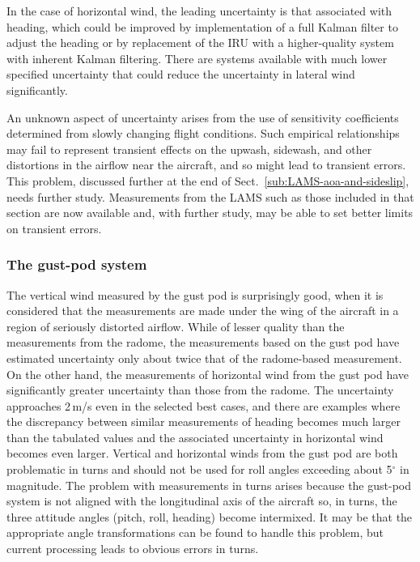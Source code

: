 \documentclass[12pt,twoside,english]{article}\usepackage[]{graphicx}\usepackage[]{color}
\let\OrgIndex\index
\renewcommand*{\index}[1]{\OrgIndex{#1}}
\begin{document}
{{In the case of horizontal wind, the leading uncertainty is that associated with heading, which could be improved by implementation of a full Kalman filter to adjust the heading or by replacement of the IRU with a higher-quality system with inherent Kalman filtering. There are systems available with much lower specified uncertainty that could reduce the uncertainty in lateral wind significantly. 

An unknown aspect of uncertainty arises from the use of sensitivity coefficients determined from slowly changing flight conditions. Such empirical relationships may fail to represent transient effects on the upwash, sidewash, and other distortions in the airflow near the aircraft, and so might lead to transient errors. This problem, discussed further at the end of Sect.\ \ref{sub:LAMS-aoa-and-sideslip}, needs further study. Measurements from the LAMS such as those included in that section are now available and, with further study, may be able to set better limits on transient errors. 


\subsubsection{The gust-pod system}

The vertical wind measured by the gust pod is surprisingly good, when it is considered that the measurements are made under the wing of the aircraft in a region of seriously distorted airflow. While of lesser quality than the measurements from the radome, the measurements based on the gust pod have estimated uncertainty only about twice that of the radome-based measurement. On the other hand, the measurements of horizontal wind from the gust pod have significantly greater uncertainty than those from the radome. The uncertainty approaches 2\,m/s even in the selected best cases, and there are examples where the discrepancy between similar measurements of heading becomes much larger than the tabulated values and the associated uncertainty in horizontal wind becomes even larger. Vertical and horizontal winds from the gust pod are both problematic in turns and should not be used for roll angles exceeding about 5$^{\circ}$ in magnitude. The problem with measurements in turns arises because the gust-pod system is not aligned with the longitudinal axis of the aircraft so, in turns, the three attitude angles (pitch, roll, heading) become intermixed. It may be that the appropriate angle transformations can be found to handle this problem, but current processing leads to obvious errors in turns. 

}}
\end{document}
